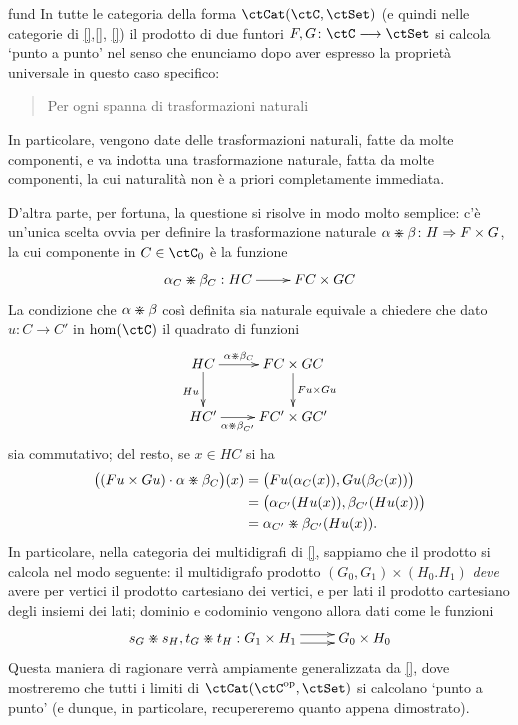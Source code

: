 \begin{hExample}{fund}\label{ex_prodotti_in_copresh}
 In tutte le categoria della forma \(\copresh\ctC\) (e quindi nelle categorie di \ref{},\ref{}, \ref{}) il prodotto di due funtori \(F,G \colon\ctC\fun\ctSet\) si calcola `punto a punto' nel senso che enunciamo dopo aver espresso la proprietà universale in questo caso specifico:
 \begin{quote}
  Per ogni spanna di trasformazioni naturali
 \end{quote}
 In particolare, vengono date delle trasformazioni naturali, fatte da molte componenti, e va indotta una trasformazione naturale, fatta da molte componenti, la cui naturalità non è a priori completamente immediata.

 D'altra parte, per fortuna, la questione si risolve in modo molto semplice: c'è un'unica scelta ovvia per definire la trasformazione naturale \(\alpha\pmap\beta \colon H \natto F\times G\), la cui componente in \(C\in\ctC_0\) è la funzione
 \[\xymatrix{
   {\alpha_C}\pmap{\beta_C} : HC \ar[r] & FC\times GC
  }\]
 La condizione che \(\alpha\divideontimes\beta\) così definita sia naturale equivale a chiedere che dato \(u \colon C\to C'\) in \(\hom(\ctC)\) il quadrato di funzioni
 \[\xymatrix{
  HC \ar[r]^-{\alpha\pmap\beta_C} \ar[d]_{Hu} & FC\times GC \ar[d]^-{Fu\times Gu} \\
  HC' \ar[r]_-{\alpha\pmap\beta_{C'}} & FC'\times GC'
  }\]
 sia commutativo; del resto, se \(x\in HC\) si ha
 \begin{align*}
  \bigl((Fu\times Gu)\cdot\alpha\divideontimes\beta_C\bigr)(x) & = \bigl( Fu(\alpha_C(x)) , Gu(\beta_C(x)) \bigr)       \\
                                                     & = \bigl( \alpha_{C'}(Hu(x)) , \beta_{C'}(Hu(x)) \bigr) \\
                                                     & = {\alpha_{C'}}\divideontimes{\beta_{C'}}(Hu(x)).
 \end{align*}
 In particolare, nella categoria dei multidigrafi di \ref{}, sappiamo che il prodotto si calcola nel modo seguente:
 il multidigrafo prodotto \((G_0,G_1)\times(H_0.H_1)\) \emph{deve} avere per vertici il prodotto cartesiano dei vertici, e per lati il prodotto cartesiano degli insiemi dei lati; dominio e codominio vengono allora dati come le funzioni
 \[\xymatrix{
   s_G\pmap s_H,t_G\pmap t_H:  G_1\times H_1\ar@<.3em>[r]\ar@<-.3em>[r] & G_0\times H_0
  }\]
 Questa maniera di ragionare verrà ampiamente generalizzata da \ref{}, dove mostreremo che tutti i limiti di \(\presh\ctC\) si calcolano `punto a punto' (e dunque, in particolare, recupereremo quanto appena dimostrato).
\end{hExample}
